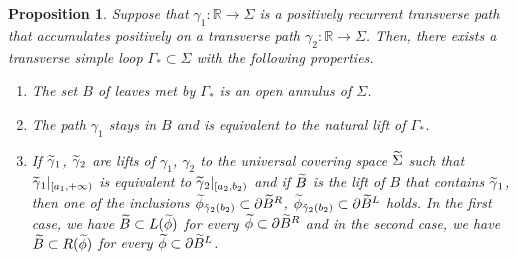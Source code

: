 \documentclass[10pt,a4paper]{article}
\newtheorem{prop}{Proposition}[section]
\theoremstyle{definition}
\theoremstyle{plain}
\numberwithin{equation}{section}
\numberwithin{figure}{section}
\newcommand{\R}{\mathbb{R}}
\let\oldtilde\tilde
\renewcommand*{\tilde}[1]{\mathchoice{\widetilde{#1}}{\widetilde{#1}}{\oldtilde{#1}}{\oldtilde{#1}}}
\begin{document}
\begin{prop}\label{prop: nontransitivity3}
Suppose that $\gamma_1:\R\to \Sigma$ is a positively recurrent transverse path that accumulates positively on a transverse path $\gamma_2:\R\to \Sigma$. Then, there exists a transverse simple loop $\Gamma_*\subset\Sigma$ with the following properties.
\begin{enumerate}
\item The set $B$ of leaves met by $\Gamma_*$ is an open annulus of $\Sigma$.
\item The path $\gamma_1$ stays in $B$ and is equivalent to the natural lift of $\Gamma_*$.
\item If $\tilde\gamma_1$, $\tilde\gamma_2$ are lifts of $\gamma_1$, $\gamma_2$ to the universal covering space $\tilde\Sigma$ such that $\tilde\gamma_1\vert_{[a_1,+\infty)}$ is equivalent to $\tilde\gamma_2\vert_{[a_2,b_2)}$ and if $\tilde B$ is the lift of $B$ that contains $\tilde\gamma_1$, then one of the inclusions $\tilde\phi_{\tilde\gamma_2(b_2)}\subset \partial \tilde B^R$, $\tilde\phi_{\tilde\gamma_2(b_2)}\subset \partial \tilde B^L$ holds. In the first case, we have $\tilde B\subset L(\tilde \phi)$ for every $\tilde \phi\subset \partial \tilde B^R$ and in the second case, we have $\tilde B\subset R(\tilde \phi)$ for every $\tilde \phi\subset \partial \tilde B^L$.
\end{enumerate}
\end{prop}
\end{document}
